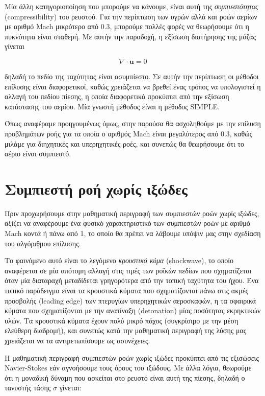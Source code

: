 Μία άλλη κατηγοριοποίηση που μπορούμε να κάνουμε, είναι αυτή της \emph{συμπιεστότητας} (compressibility) του ρευστού.
Για την περίπτωση των υγρών αλλά και ροών αερίων με αριθμό Mach μικρότερο από 0.3, μπορούμε πολλές φορές να θεωρήσουμε ότι η πυκνότητα είναι σταθερή.
Με αυτήν την παραδοχή, η εξίσωση διατήρησης της μάζας γίνεται

\begin{equation*}
    \nabla \cdot \mathbf{u} = 0
\end{equation*}

δηλαδή το πεδίο της ταχύτητας είναι ασυμπίεστο.
Σε αυτήν την περίπτωση οι μέθοδοι επίλυσης είναι διαφορετικοί, καθώς χρειάζεται να βρεθεί ένας τρόπος να υπολογιστεί η αλλαγή του πεδίου πίεσης, η οποία διαφορετικά προκύπτει από την εξίσωση κατάστασης του αερίου.
Μία γνωστή μέθοδος είναι η μέθοδος SIMPLE.

Όπως αναφέραμε προηγουμένως όμως, στην παρούσα θα ασχοληθούμε με την επίλυση προβλημάτων ροής για τα οποία ο αριθμός Mach είναι μεγαλύτερος από 0.3, καθώς μιλάμε για διηχητικές και υπερηχητικές ροές, και συνεπώς θα θεωρήσουμε ότι το αέριο είναι συμπιεστό.

\section{Συμπιεστή ροή χωρίς ιξώδες}

Πριν προχωρήσουμε στην μαθηματική περιγραφή των συμπιεστών ροών χωρίς ιξώδες, αξίζει να αναφέρουμε ένα φυσικό χαρακτηριστικό των συμπιεστών ροών με αριθμό Mach κοντά ή πάνω από 1, το οποίο θα πρέπει να λάβουμε υπόψιν μας στην σχεδίαση του αλγόριθμου επίλυσης.

Το φαινόμενο αυτό είναι το λεγόμενο \emph{κρουστικό κύμα} (shockwave), το οποίο αναφέρεται σε μία απότομη αλλαγή στις τιμές των ροϊκών πεδίων που σχηματίζεται όταν μία διαταραχή μεταδίδεται γρηγορότερα από την τοπική ταχύτητα του ήχου.
Ένα τυπικό παράδειγμα είναι τα κρουστικά κύματα που σχηματίζονται πάνω στις ακμές προσβολής (leading edge) των πτερυγίων υπερηχητικών αεροσκαφών, η τα σφαιρικά κύματα που σχηματίζονται με την ανατίναξη (detonation) μίας ποσότητας εκρηκτικών υλών.
Τα κρουστικά κύματα έχουν πολύ μικρό πάχος (συγκρίσιμο με την μέση ελεύθερη διαδρομή), και συνεπώς κατά την μαθηματική περιγραφή της λύσης μας χρειάζεται να τα αντιμετωπίσουμε ως ασυνέχειες.

Η μαθηματική περιγραφή συμπιεστών ροών χωρίς ιξώδες προκύπτει από τις εξισώσεις Navier-Stokes εάν αγνοήσουμε τους όρους του ιξώδους.
Με άλλα λόγια, θεωρούμε ότι η μοναδική δύναμη που ασκείται στο ρευστό είναι αυτή της πίεσης, δηλαδή ο τανυστής τάσης $\sigma$ γίνεται:

